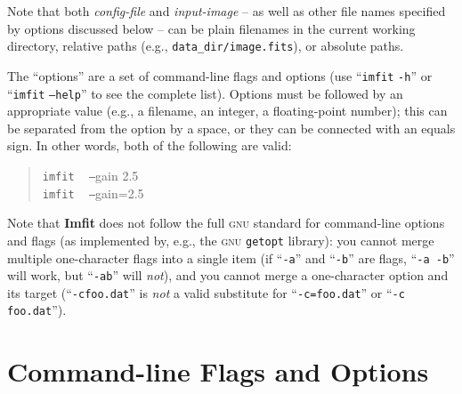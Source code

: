 \documentclass[10pt,a4paper,article]{memoir}
\newcommand{\imfit}{\textbf{Imfit}}
\newcommand{\imfitprog}{\texttt{imfit}}
\begin{document}
Note that both \textit{config-file} and \textit{input-image} -- as well
as other file names specified by options discussed below -- can be plain
filenames in the current working directory, relative paths (e.g.,
\texttt{data\_dir/image.fits}), or absolute paths.

The ``options'' are a set of command-line flags and options (use ``\imfitprog{} \texttt{-h}''
or ``\imfitprog{} \texttt{--help}'' to see the complete list). Options must be followed by
an appropriate value (e.g., a filename, an integer, a floating-point number); this can
be separated from the option by a space, or they can be connected with an equals sign.
In other words, both of the following are valid:
\begin{quote}
\imfitprog{} ~ \texttt{--}gain 2.5 \\
\imfitprog{} ~ \texttt{--}gain=2.5
\end{quote}
Note that \imfit{} does not follow the full \textsc{gnu} standard for
command-line options and flags (as implemented by, e.g., the \textsc{gnu}
\texttt{getopt} library): you cannot merge multiple one-character flags
into a single item (if ``\texttt{-a}'' and ``\texttt{-b}'' are flags,
``\texttt{-a -b}'' will work, but ``\texttt{-ab}'' will \textit{not}), and you
cannot merge a one-character option and its target
(``\texttt{-cfoo.dat}'' is \textit{not} a valid substitute for
``\texttt{-c=foo.dat}'' or ``\texttt{-c foo.dat}'').


\section{Command-line Flags and Options}\label{sec:imfit-flags}
\end{document}
